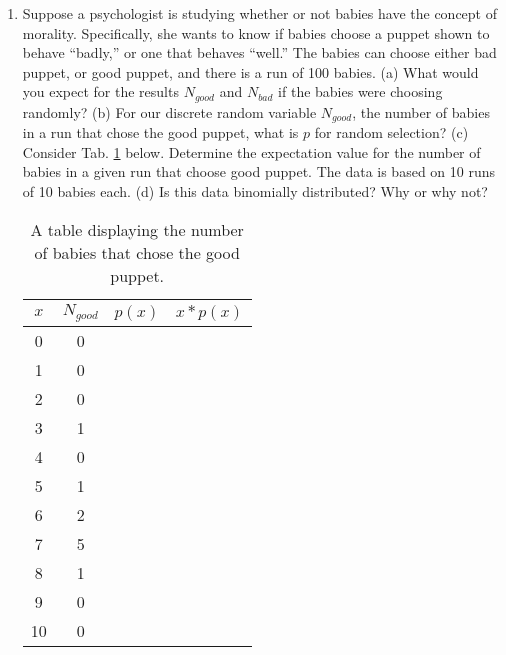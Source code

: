 \documentclass{article}
\begin{document}
\begin{enumerate}
\item Suppose a psychologist is studying whether or not babies have the concept of morality.  Specifically, she wants to know if babies choose a puppet shown to behave ``badly,'' or one that behaves ``well.''  The babies can choose either bad puppet, or good puppet, and there is a run of 100 babies. (a) What would you expect for the results $N_{good}$ and $N_{bad}$ if the babies were choosing randomly? (b) For our discrete random variable $N_{good}$, the number of babies in a run that chose the good puppet, what is $p$ for random selection?  (c) Consider Tab. \ref{tab:stock} below.  Determine the expectation value for the number of babies in a given run that choose good puppet.  The data is based on 10 runs of 10 babies each. (d) Is this data binomially distributed?  Why or why not?
\begin{table}
\centering
\begin{tabular}{| c | c | c | c |}
\hline
\textbf{$x$} & $N_{good}$ & $p(x)$ & $x*p(x)$ \\ \hline \hline
0 & 0 &  &  \\ \hline
1 & 0 &  &  \\ \hline
2 & 0 &  &  \\ \hline
3 & 1 &  &  \\ \hline
4 & 0 &  &  \\ \hline
5 & 1 &  &  \\ \hline
6 & 2 &  &  \\ \hline
7 & 5 &  &  \\ \hline
8 & 1 &  &  \\ \hline
9 & 0 &  &  \\ \hline
10 & 0 &  &  \\ \hline
\hline
\end{tabular}
\caption{\label{tab:stock} A table displaying the number of babies that chose the good puppet.}
\end{table}
\end{enumerate}
\end{document}
